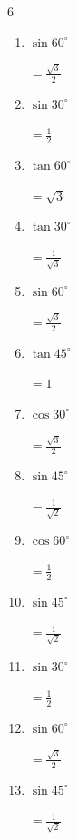 \begin{multicols}{6}
\begin{enumerate}
  \item $\displaystyle \sin{60^\circ}$

        $\displaystyle =\frac{\sqrt{3}}{2}$

  \item $\displaystyle \sin{30^\circ}$

        $\displaystyle =\frac{1}{2}$

  \item $\displaystyle \tan{60^\circ}$

        $\displaystyle =\sqrt{3}$

  \item $\displaystyle \tan{30^\circ}$

        $\displaystyle =\frac{1}{\sqrt{3}}$

  \item $\displaystyle \sin{60^\circ}$

        $\displaystyle =\frac{\sqrt{3}}{2}$

  \item $\displaystyle \tan{45^\circ}$

        $\displaystyle =1$

  \item $\displaystyle \cos{30^\circ}$

        $\displaystyle =\frac{\sqrt{3}}{2}$

  \item $\displaystyle \sin{45^\circ}$

        $\displaystyle =\frac{1}{\sqrt{2}}$

  \item $\displaystyle \cos{60^\circ}$

        $\displaystyle =\frac{1}{2}$

\columnbreak %

  \item $\displaystyle \sin{45^\circ}$

        $\displaystyle =\frac{1}{\sqrt{2}}$

  \item $\displaystyle \sin{30^\circ}$

        $\displaystyle =\frac{1}{2}$

  \item $\displaystyle \sin{60^\circ}$

        $\displaystyle =\frac{\sqrt{3}}{2}$

  \item $\displaystyle \sin{45^\circ}$

        $\displaystyle =\frac{1}{\sqrt{2}}$


\end{enumerate}
\end{multicols}
